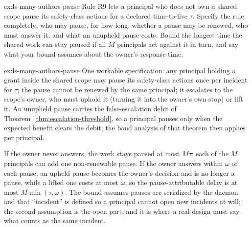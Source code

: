 \begin{pdexercise}[kind=Open,rating=3]{ex:ls-many-authors-pause}
Rule R9 lets a principal who does not own a shared scope pause its
safety-class actions for a declared time-to-live $\tau$. Specify the rule
completely: who may pause, for how long, whether a pause may be renewed, who
must answer it, and what an unupheld pause costs. Bound the longest time the
shared work can stay paused if all $M$ principals act against it in turn, and
say what your bound assumes about the owner's response time.
\end{pdexercise}
\begin{pdsolution}{ex:ls-many-authors-pause}
One workable specification: any principal holding a grant inside the shared
scope may pause its safety-class actions once per incident for $\tau$; the
pause cannot be renewed by the same principal; it escalates to the scope's
owner, who must uphold it (turning it into the owner's own stop) or lift it.
An unupheld pause carries the false-escalation debit of
Theorem~\ref{thm:escalation-threshold}, so a principal pauses only when the
expected benefit clears the debit; the band analysis of that theorem then
applies per principal.

If the owner never answers, the work stays paused at most $M\tau$: each of the
$M$ principals can add one non-renewable pause. If the owner answers within
$\omega$ of each pause, an upheld pause becomes the owner's decision and is no
longer a pause, while a lifted one costs at most $\omega$, so the
pause-attributable delay is at most $M\min(\tau,\omega)$. The bound assumes
pauses are serialized by the daemon and that ``incident'' is defined so a
principal cannot open new incidents at will; the second assumption is the
open part, and it is where a real design must say what counts as the same
incident.
\end{pdsolution}
